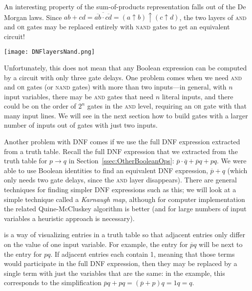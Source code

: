 An interesting property of the sum-of-products representation falls out of the De Morgan laws. Since $ab+cd=\overline{\overline{ab}\cdot\overline{cd}}=(a\uparrow b)\uparrow(c\uparrow d)$, the two layers of \textsc{and} and \textsc{or} gates may be replaced entirely with \textsc{nand} gates to get an equivalent circuit!
\begin{center}
\texttt{[image: DNFlayersNand.png]}
\end{center}

Unfortunately, this does not mean that any Boolean expression can be computed by a circuit with only three gate delays. One problem comes when we need \textsc{and} and \textsc{or} gates (or \textsc{nand} gates) with more than two inputs---in general, with $n$ input variables, there may be \textsc{and} gates that need $n$ literal inputs, and there could be on the order of $2^n$ gates in the \textsc{and} level, requiring an \textsc{or} gate with that many input lines. We will see in the next section how to build gates with a larger number of inputs out of gates with just two inputs.

Another problem with DNF comes if we use the full DNF expression extracted from a truth table. Recall the full DNF expression that we extracted from the truth table for $p\rightarrow q$ in Section~\ref{ssec:OtherBooleanOps}: $\overline{p}\cdot\overline{q}+\overline{p}q+pq$. We were able to use Boolean identities to find an equivalent DNF expression, $\overline{p}+q$ (which only needs two gate delays, since the \textsc{and} layer disappears). There are general techniques for finding simpler DNF expressions such as this; we will look at a simple technique called a \textit{Karnaugh map}, although for computer implementation the related Quine-McCluskey algorithm is better (and for large numbers of input variables a heuristic approach is necessary).

 is a way of visualizing entries in a truth table so that adjacent entries only differ on the value of one input variable. For example, the entry for $\overline{p}q$ will be next to the entry for $pq$. If adjacent entries each contain 1, meaning that those terms would participate in the full DNF expression, then they may be replaced by a single term with just the variables that are the same: in the example, this corresponds to the simplification $\overline{p}q + pq=(\overline{p}+p)q=1q=q$.

